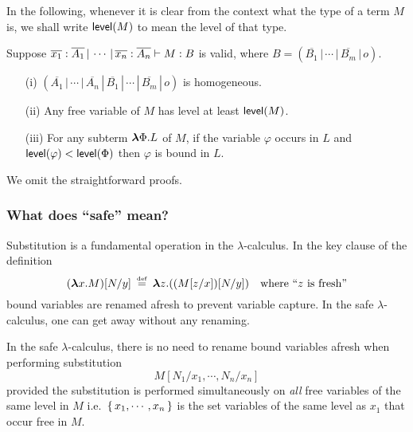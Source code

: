In the following, whenever it is clear from the context what the
type of a term $M$ is, we shall write ${\sf level}(M)$ to mean the
level of that type.
\begin{lemma}\label{lem:safe}
Suppose ${{\overline{x_1} :
\overline{A_1}\, | \, \cdots\, | \, \overline{x_n} : \overline{A_n}} \vdash {M
: B}}$ is valid, where $B = (\overline{B_1} \, | \,
\cdots \, | \, \overline{B_m} \, | \, o)$.
\begin{itemize}
\item[(i)] $(\overline{A_1} \, | \, \cdots \, | \, \overline{A_n}
\, | \, \overline{B_1} \, | \, \cdots \, | \, \overline{B_m} \, |
\, o)$ is homogeneous. \item[(ii)] Any free variable of $M$ has
level at least ${\sf level}(M)$. \item[(iii)] For any subterm
${\hbox{\boldmath $\lambda$}{\Phi}.{L}}$ of $M$, if the variable $\varphi$ occurs in $L$
and ${\sf level}(\varphi) < {\sf level}(\Phi)$ then $\varphi$ is bound in
$L$. \myendproof
\end{itemize}
\end{lemma}

We omit the straightforward proofs.

\subsubsection*{What does ``safe'' mean?}

Substitution is a fundamental operation in the $\lambda$-calculus.
In the key clause of the definition
\[ (\lterm{x}{M})[N / y] \; \defined \; \lterm{z}{((M[z / x]) [N / y])} \quad
\hbox{where ``$z$ is fresh''}\] bound variables are renamed afresh to
prevent variable capture. In the {safe $\lambda$-calculus}, one can
get away without any renaming.

\begin{lemma}In the safe $\lambda$-calculus, there is no need to
rename bound variables afresh when performing substitution
\[M[N_1 / x_1 , \cdots, N_n / x_n]\]
provided the substitution is performed simultaneously on
\emph{all} free variables of the same level in $M$
i.e.~$\{\,{x_1, \cdots, x_n}\,\}$ is the set variables of the
same level as $x_1$ that occur free in $M$.
\end{lemma}

